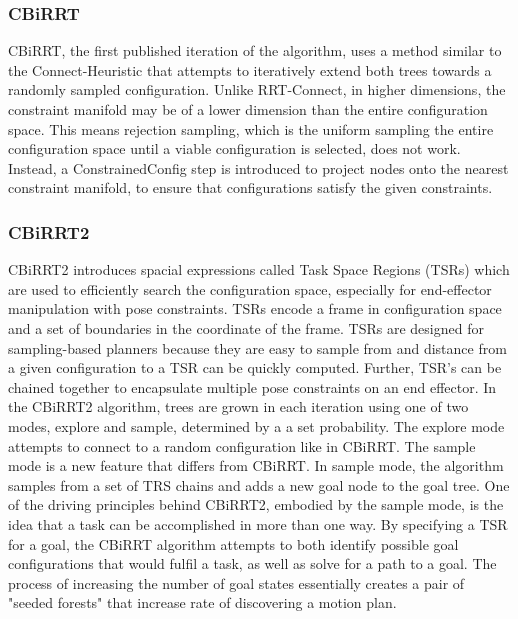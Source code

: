 \documentclass[12pt]{article}
\begin{document}
        \subsubsection{CBiRRT} 
            CBiRRT, the first published iteration of the algorithm, uses a method similar to the Connect-Heuristic that attempts to iteratively extend both trees towards a randomly sampled configuration. Unlike RRT-Connect, in higher dimensions, the constraint manifold may be of a lower dimension than the entire configuration space. This means rejection sampling, which is the uniform sampling the entire configuration space until a viable configuration is selected, does not work. Instead, a ConstrainedConfig step is introduced to project nodes onto the nearest constraint manifold, to ensure that configurations satisfy the given constraints. \cite{berenson_manipulation_2009}
        
        \subsubsection{CBiRRT2} 
            CBiRRT2 introduces spacial expressions called Task Space Regions (TSRs) which are used to efficiently search the configuration space, especially for end-effector manipulation with pose constraints. TSRs encode a frame in configuration space and a set of boundaries in the coordinate of the frame. TSRs are designed for sampling-based planners because they are easy to sample from and distance from a given configuration to a TSR can be quickly computed. Further, TSR's can be chained together to encapsulate multiple pose constraints on an end effector. In the CBiRRT2 algorithm, trees are grown in each iteration using one of two modes, explore and sample, determined by a a set probability. The explore mode attempts to connect to a random configuration like in CBiRRT. The sample mode is a new feature that differs from CBiRRT. In sample mode, the algorithm samples from a set of TRS chains and adds a new goal node to the goal tree. One of the driving principles behind CBiRRT2, embodied by the sample mode, is the idea that a task can be accomplished in more than one way. By specifying a TSR for a goal, the CBiRRT algorithm attempts to both identify possible goal configurations that would fulfil a task, as well as solve for a path to a goal. The process of increasing the number of goal states essentially creates a pair of "seeded forests" that increase rate of discovering a motion plan. \cite{berenson_pose-constrained_2009} 
\end{document}
